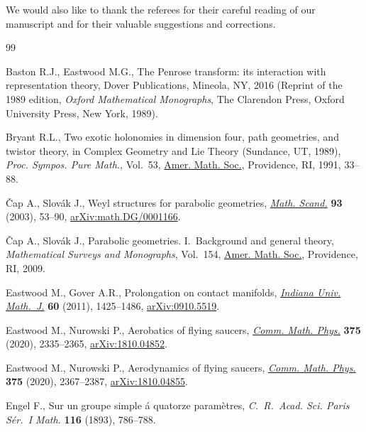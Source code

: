 \documentclass[pdftex]{sigma}%
\numberwithin{equation}{section}
\begin{document}
We would also like to thank the referees for their careful reading of our
manuscript and for their valuable suggestions and corrections.

\begin{thebibliography}{99}
\footnotesize\itemsep=0pt

Baston R.J., Eastwood M.G., The {P}enrose transform: its interaction with
 representation theory, Dover Publications, Mineola, NY, 2016
 (Reprint of the 1989 edition, \textit{Oxford Mathematical Monographs}, The Clarendon Press,
 Oxford University Press, New York, 1989).

Bryant R.L., Two exotic holonomies in dimension four, path geometries, and
 twistor theory, in Complex Geometry and {L}ie Theory ({S}undance, {UT},
 1989), \textit{Proc. Sympos. Pure Math.}, Vol.~53, \href{https://doi.org/10.1090/pspum/053/1141197}{Amer. Math. Soc.},
 Providence, RI, 1991, 33--88.

\v{C}ap A., Slov\'ak J., Weyl structures for parabolic geometries,
 \href{https://doi.org/10.7146/math.scand.a-14413}{\textit{Math. Scand.}} \textbf{93} (2003), 53--90, \href{https://arxiv.org/abs/math.DG/0001166}{arXiv:math.DG/0001166}.

\v{C}ap A., Slov\'ak J., Parabolic geometries. {I}.~Background and general
 theory, \textit{Mathematical Surveys and Monographs}, Vol.~154, \href{https://doi.org/10.1090/surv/154}{Amer. Math.
 Soc.}, Providence, RI, 2009.

Eastwood M., Gover A.R., Prolongation on contact manifolds, \href{https://doi.org/10.1512/iumj.2011.60.4980}{\textit{Indiana
 Univ. Math.~J.}} \textbf{60} (2011), 1425--1486, \href{https://arxiv.org/abs/0910.5519}{arXiv:0910.5519}.

Eastwood M., Nurowski P., Aerobatics of flying saucers, \href{https://doi.org/10.1007/s00220-019-03621-2}{\textit{Comm. Math.
 Phys.}} \textbf{375} (2020), 2335--2365, \href{https://arxiv.org/abs/1810.04852}{arXiv:1810.04852}.

Eastwood M., Nurowski P., Aerodynamics of flying saucers, \href{https://doi.org/10.1007/s00220-019-03622-1}{\textit{Comm. Math.
 Phys.}} \textbf{375} (2020), 2367--2387, \href{https://arxiv.org/abs/1810.04855}{arXiv:1810.04855}.

Engel F., Sur un groupe simple \'a quatorze param\`etres, \textit{C.~R.~Acad.
 Sci. Paris S\'er.~I Math.} \textbf{116} (1893), 786--788.


\end{thebibliography}
\end{document}

